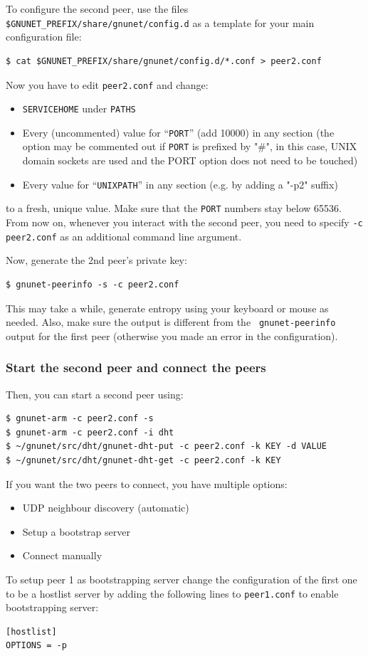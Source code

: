 \documentclass[10pt]{article}
\begin{document}
To configure the second peer, use the files {\tt
  \$GNUNET\_PREFIX/share/gnunet/config.d} as a template for your main
configuration file:
%
\lstset{language=bash}
\begin{lstlisting}
$ cat $GNUNET_PREFIX/share/gnunet/config.d/*.conf > peer2.conf
\end{lstlisting}
Now you have to edit {\tt peer2.conf} and change:
\begin{itemize}
  \itemsep0em
  \item{\texttt{SERVICEHOME} under \texttt{PATHS}}
  \item{Every (uncommented) value for ``\texttt{PORT}'' (add 10000) in any
        section (the option may be commented out if \texttt{PORT} is
        prefixed by "\#", in this case, UNIX domain sockets are used
        and the PORT option does not need to be touched) }
  \item{Every value for ``\texttt{UNIXPATH}'' in any section (e.g. by adding a "-p2" suffix)}
\end{itemize}
to a fresh, unique value.  Make sure that the \texttt{PORT} numbers stay
below 65536.  From now on, whenever you interact with the second
peer, you need to specify {\tt -c peer2.conf} as an additional
command line argument.

Now, generate the 2nd peer's private key:

\lstset{language=bash}
\begin{lstlisting}
$ gnunet-peerinfo -s -c peer2.conf
\end{lstlisting}

This may take a while, generate entropy using your keyboard or mouse
as needed.  Also, make sure the output is different from the {\tt
  gnunet-peerinfo} output for the first peer (otherwise you made an
error in the configuration).

\subsubsection{Start the second peer and connect the peers}
Then, you can start a second peer using:
\lstset{language=bash}
\begin{lstlisting}
$ gnunet-arm -c peer2.conf -s
$ gnunet-arm -c peer2.conf -i dht
$ ~/gnunet/src/dht/gnunet-dht-put -c peer2.conf -k KEY -d VALUE
$ ~/gnunet/src/dht/gnunet-dht-get -c peer2.conf -k KEY
\end{lstlisting}
If you want the two peers to connect, you have multiple options:
\begin{itemize}
\itemsep0em
  \item UDP neighbour discovery (automatic)
  \item Setup a bootstrap server
  \item Connect manually
\end{itemize}
To setup peer 1 as bootstrapping server change the configuration of
the first one to be a hostlist server by adding the following lines to
\texttt{peer1.conf} to enable bootstrapping server:
 \begin{lstlisting}
[hostlist]
OPTIONS = -p
\end{lstlisting}
\end{document}
